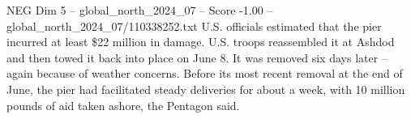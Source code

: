 \begin{textsample}{NEG Dim 5 – global\_north\_2024\_07 – Score -1.00 – global\_north\_2024\_07/110338252.txt}
U.S. officials estimated that the pier incurred at least \$22 million in damage.
U.S. troops reassembled it at Ashdod and then towed it back into place on June 8.
It was removed six days later -- again because of weather concerns.
Before its most recent removal at the end of June, the pier had facilitated steady deliveries for about a week, with 10 million pounds of aid taken ashore, the Pentagon said.

\end{textsample}
